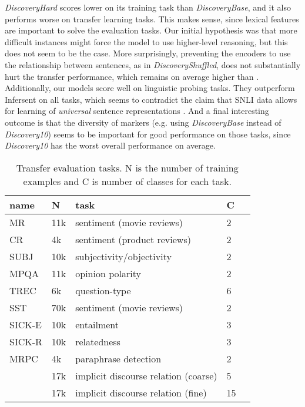 \documentclass[11pt,a4paper]{article}
\begin{document}
{\it DiscoveryHard} scores lower on its training task than {\it DiscoveryBase}, and it also performs worse on transfer learning tasks. This makes sense, since lexical features are important to solve the evaluation tasks. Our initial hypothesis was that more difficult instances might force the model to use higher-level reasoning, but this does not seem to be the case. More surprisingly, preventing the encoders to use the relationship between sentences, as in {\it DiscoveryShuffled}, does not substantially hurt the transfer performance, which remains on average higher than \citet{Nie2017}. Additionally,  our models score well on linguistic probing tasks. They outperform Infersent on all tasks, which seems to contradict the claim that SNLI data allows for learning of {\it universal} sentence representations \citep{Conneau2017}. And a final interesting outcome is that the diversity of markers (e.g. using {\it DiscoveryBase} instead of {\it Discovery10})  seems to be important for good performance on those tasks, since {\it Discovery10} has the worst overall performance on average.

 \begin{table}[htb]
\small
\begin{center}
\begin{tabular}{lllll}
\toprule
   name &     N &                         task &           C              \\
\midrule
     MR &   11k &           sentiment (movie reviews) &           2 &                        \\
     CR &    4k &  sentiment (product reviews) &           2 &                       \\
   SUBJ &   10k &     subjectivity/objectivity &           2 &                         \\
   MPQA &   11k &             opinion polarity &           2 & \\
   TREC &    6k &                question-type &           6 &                     \\
   SST &   70k &                sentiment (movie reviews) &           2 &                        \\
 SICK-E&   10k &             entailment  &           3 &         \\
  SICK-R&   10k &                          relatedness &           3 &             \\
   MRPC &  4k &         paraphrase detection &           2 &   \\
   &  17k &                 implicit discourse relation (coarse) &  5 &         \\
   &  17k &                 implicit discourse relation (fine) &  15 &         \\

\bottomrule
\end{tabular}
\end{center}
 \caption{Transfer evaluation tasks. N is the number of training examples and C is number of classes for each task.}
\label{table:evaltasks}
 \end{table}
\end{document}
